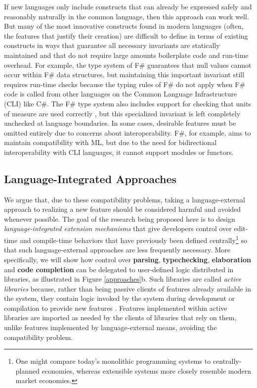 If new languages only include constructs that can already be expressed safely and reasonably naturally in the common language, then this approach can work well. 
But many of the most innovative constructs found in modern languages (often, the features that justify their creation) are difficult to define in terms of existing constructs in ways that guarantee all necessary invariants are statically maintained and that do not require large amounts boilerplate code and run-time overhead. For example, the type system of F\# guarantees that null values cannot occur within F\# data structures, but maintaining this important invariant still requires run-time checks because the typing rules of F\# do not apply when F\# code is called from other languages on the Common Language Infrastructure (CLI) like C\#. The F\# type system also includes support for checking that units of measure are used correctly \cite{fsharpunits}, but this specialized invariant is left completely unchecked at language boundaries. 
In some cases, desirable features must be omitted entirely due to concerns about  interoperability. F\#, for example, aims to maintain compatibility with ML, but due to the need for bidirectional interoperability with CLI languages, it cannot support modules or functors.

\subsection{Language-Integrated Approaches}
We argue that, due to these compatibility problems, taking a language-external approach to realizing a new feature should be considered harmful and avoided whenever possible. The goal of the research being proposed here is to design \emph{language-integrated extension mechanisms} that give developers control over edit-time and compile-time behaviors that have previously been defined centrally\footnote{One might compare today's monolithic programming systems to  {centrally-planned} economies, whereas extensible\- systems more closely resemble modern market economies.} so that such language-external approaches are less frequently necessary. More specifically, we will show how control over \textbf{parsing}, \textbf{typechecking}, \textbf{elaboration} and \textbf{code completion} can be delegated to user-defined logic distributed in {libraries}, as illustrated in Figure \ref{approaches}b. 
Such libraries are called \emph{active libraries} because, rather than being passive clients of features already available in the system, they contain logic invoked by the system during development or compilation to provide new features  \cite{active-libraries}. Features implemented within active libraries are imported as needed by the clients of libraries that rely on them, unlike features implemented by language-external means, avoiding the compatibility problem.

